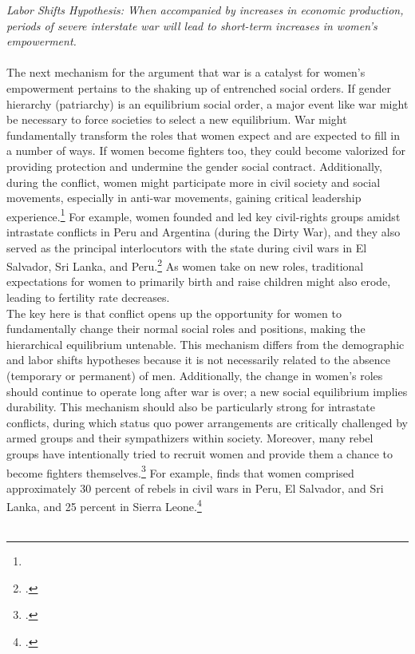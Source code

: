 \documentclass [12pt] {article}
\begin{document}
\emph{Labor Shifts Hypothesis: When accompanied by increases in economic production, periods of severe interstate war will lead to short-term increases in women's empowerment.} \\ \\
 
The next mechanism for the argument that war is a catalyst for women's empowerment pertains to the shaking up of entrenched social orders. If gender hierarchy (patriarchy) is an equilibrium social order, a major event like war might be necessary to force societies to select a new equilibrium. War might fundamentally transform the roles that women expect and are expected to fill in a number of ways. If women become fighters too, they could become valorized for providing protection and undermine the gender social contract. Additionally, during the conflict, women might participate more in civil society and social movements, especially in anti-war movements, gaining critical leadership experience.\footnote{} For example, women founded and led key civil-rights groups amidst intrastate conflicts in Peru and Argentina (during the Dirty War), and they also served as the principal interlocutors with the state during civil wars in El Salvador, Sri Lanka, and Peru.\footnote{.} As women take on new roles, traditional expectations for women to primarily birth and raise children might also erode, leading to fertility rate decreases. \\

The key here is that conflict opens up the opportunity for women to fundamentally change their normal social roles and positions, making the hierarchical equilibrium untenable. This mechanism differs from the demographic and labor shifts hypotheses because it is not necessarily related to the absence (temporary or permanent) of men. Additionally, the change in women's roles should continue to operate long after war is over; a new social equilibrium implies durability. This mechanism should also be particularly strong for intrastate conflicts, during which status quo power arrangements are critically challenged by armed groups and their sympathizers within society. Moreover, many rebel groups have intentionally tried to recruit women and provide them a chance to become fighters themselves.\footnote{.} For example, \citeauthor{wood2008social} finds that women comprised approximately 30 percent of rebels in civil wars in Peru, El Salvador, and Sri Lanka, and 25 percent in Sierra Leone.\footnote{.} \\  \\
\end{document}
